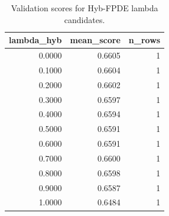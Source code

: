 \begin{table}[t]
\caption{Validation scores for Hyb-FPDE lambda candidates.}
\label{tab:lambda_distribution_computed}
\centering
\begin{tabular}{rrr}
\toprule
lambda\_hyb & mean\_score & n\_rows \\
\midrule
0.0000 & 0.6605 & 1 \\
0.1000 & 0.6604 & 1 \\
0.2000 & 0.6602 & 1 \\
0.3000 & 0.6597 & 1 \\
0.4000 & 0.6594 & 1 \\
0.5000 & 0.6591 & 1 \\
0.6000 & 0.6591 & 1 \\
0.7000 & 0.6600 & 1 \\
0.8000 & 0.6598 & 1 \\
0.9000 & 0.6587 & 1 \\
1.0000 & 0.6484 & 1 \\
\bottomrule
\end{tabular}

\end{table}
